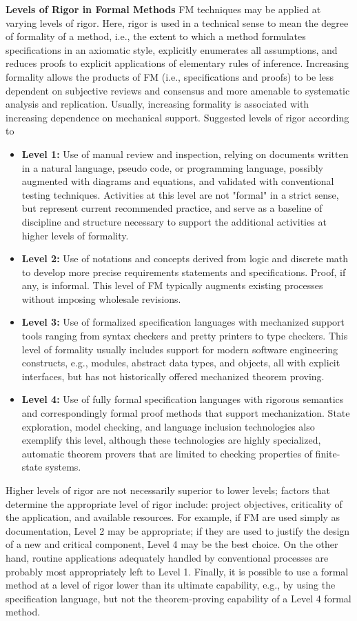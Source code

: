 \documentclass{template/openetcs_report}
\begin{document}
\textbf{Levels of Rigor in Formal Methods }
FM techniques may be applied at varying levels of rigor. Here, rigor is used in a technical sense to mean the degree of formality of a method, i.e., the extent to which a method formulates specifications in an axiomatic style, explicitly enumerates all assumptions, and reduces proofs to explicit applications of elementary rules of inference. Increasing formality allows the products of FM (i.e., specifications and proofs) to be less dependent on subjective reviews and consensus and more amenable to systematic analysis and replication. Usually, increasing formality is associated with increasing dependence on mechanical support. Suggested levels of rigor according to \cite{FM-doc}
\begin{itemize}\itemsep=0pt
  \item \textbf{Level 1:} Use of manual review and inspection, relying on documents written in a natural language, pseudo code, or programming language, possibly augmented with diagrams and equations, and validated with conventional testing techniques. Activities at this level are not "formal" in a strict sense, but represent current recommended practice, and serve as a baseline of discipline and structure necessary to support the additional activities at higher levels of formality.
  \item \textbf{Level 2:} Use of notations and concepts derived from logic and discrete math to develop more precise requirements statements and specifications. Proof, if any, is informal. This level of FM typically augments existing processes without imposing wholesale revisions.
  \item \textbf{Level 3:} Use of formalized specification languages with mechanized support tools ranging from syntax checkers and pretty printers to type checkers. This level of formality usually includes support for modern software engineering constructs, e.g., modules, abstract data types, and objects, all with explicit interfaces, but has not historically offered mechanized theorem proving.
  \item \textbf{Level 4:} Use of fully formal specification languages with rigorous semantics and correspondingly formal proof methods that support mechanization. State exploration, model checking, and language inclusion technologies also exemplify this level, although these technologies are highly specialized, automatic theorem provers that are limited to checking properties of finite-state systems. 
\end{itemize}
Higher levels of rigor are not necessarily superior to lower levels; factors that determine the appropriate level of rigor include: project objectives, criticality of the application, and available resources. For example, if FM are used simply as documentation, Level 2 may be appropriate; if they are used to justify the design of a new and critical component, Level 4 may be the best choice. On the other hand, routine applications adequately handled by conventional processes are probably most appropriately left to Level 1. Finally, it is possible to use a formal method at a level of rigor lower than its ultimate capability, e.g., by using the specification language, but not the theorem-proving capability of a Level 4 formal method. 
\end{document}
